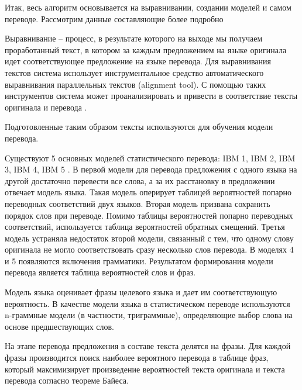 \documentclass{bmstu}
\begin{document}
	Итак, весь алгоритм основывается на выравнивании, создании моделей
	и самом переводе. Рассмотрим данные составляющие более подробно
	
	Выравнивание – процесс, в результате которого на выходе мы
	получаем проработанный текст, в котором за каждым предложением на
	языке оригинала идет соответствующее предложение на языке перевода. Для выравнивания текстов система использует инструментальное средство
	автоматического выравнивания параллельных текстов (alignment tool). С
	помощью таких инструментов система может проанализировать и привести в
	соответствие тексты оригинала и перевода \cite{smt2}. 
	
	Подготовленные таким образом тексты используются для обучения модели перевода.
	
	Существуют 5 основных моделей статистического перевода: IBM 1, IBM 2, IBM 3, IBM 4, IBM 5 \cite{smt}. В первой модели для перевода предложения с одного языка на другой достаточно перевести все слова, а за их расстановку в предложении отвечает модель языка. Такая модель оперирует таблицей вероятностей попарно переводных соответствий двух языков. Вторая модель призвана сохранить порядок слов при переводе. Помимо таблицы вероятностей попарно переводных соответствий, используется таблица вероятностей обратных смещений. Третья модель устраняла недостаток второй модели, связанный с тем, что одному слову оригинала не могло соответствовать сразу несколько слов перевода. В моделях 4 и 5 появляются включения грамматики. Результатом формирования модели перевода является таблица вероятностей слов и фраз. 
	
	Модель языка оценивает фразы целевого языка и дает им соответствующую вероятность. В качестве модели языка в статистическом переводе используются n-граммные модели (в частности, триграммные), определяющие выбор слова на основе предшествующих слов.
	
	На этапе перевода предложения в составе текста делятся на фразы. Для каждой фразы производится поиск наиболее вероятного перевода в таблице фраз, который максимизирует произведение вероятностей текста оригинала и текста перевода согласно теореме Байеса. 
	
\makebibliography
	
\end{document}
